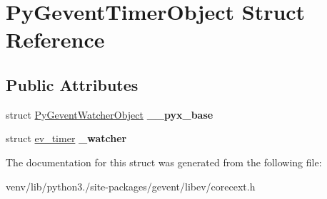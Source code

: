 \hypertarget{struct_py_gevent_timer_object}{}\section{Py\+Gevent\+Timer\+Object Struct Reference}
\label{struct_py_gevent_timer_object}
\subsection*{Public Attributes}
\begin{DoxyCompactItemize}
\item 
\mbox{\label{struct_py_gevent_timer_object_ae831b5a251a7a729bf6131a1dd31c85b}} 
struct \hyperlink{struct_py_gevent_watcher_object}{Py\+Gevent\+Watcher\+Object} {\bfseries \+\_\+\+\_\+pyx\+\_\+base}
\item 
\mbox{\label{struct_py_gevent_timer_object_ae90f7c4d07081dc62834f5078bafe2ab}} 
struct \hyperlink{structev__timer}{ev\+\_\+timer} {\bfseries \+\_\+watcher}
\end{DoxyCompactItemize}


The documentation for this struct was generated from the following file\+:\begin{DoxyCompactItemize}
\item 
venv/lib/python3./site-\/packages/gevent/libev/corecext.\+h\end{DoxyCompactItemize}
